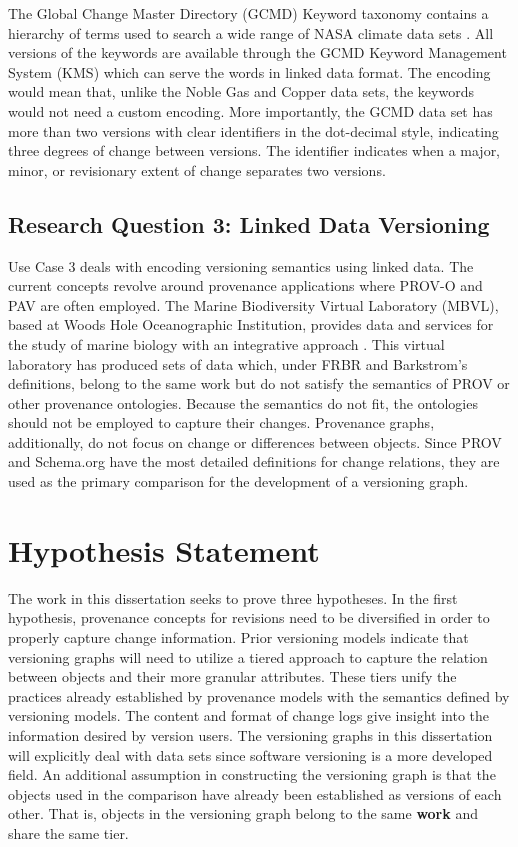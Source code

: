 The Global Change Master Directory (GCMD) Keyword taxonomy contains a hierarchy of terms used to search a wide range of NASA climate data sets \cite{GCMDKey}.
All versions of the keywords are available through the GCMD Keyword Management System (KMS) which can serve the words in linked data format.
The encoding would mean that, unlike the Noble Gas and Copper data sets, the keywords would not need a custom encoding.
More importantly, the GCMD data set has more than two versions with clear identifiers in the dot-decimal style, indicating three degrees of change between versions.
The identifier indicates when a major, minor, or revisionary extent of change separates two versions.

\subsection{Research Question 3: Linked Data Versioning}

Use Case 3 deals with encoding versioning semantics using linked data.
The current concepts revolve around provenance applications where PROV-O and PAV are often employed.
The Marine Biodiversity Virtual Laboratory (MBVL), based at Woods Hole Oceanographic Institution, provides data and services for the study of marine biology with an integrative approach \cite{mbvl}.
This virtual laboratory has produced sets of data which, under FRBR and Barkstrom's definitions, belong to the same work but do not satisfy the semantics of PROV or other provenance ontologies.
Because the semantics do not fit, the ontologies should not be employed to capture their changes.
Provenance graphs, additionally, do not focus on change or differences between objects.
Since PROV and Schema.org have the most detailed definitions for change relations, they are used as the primary comparison for the development of a versioning graph.

\section{Hypothesis Statement}

The work in this dissertation seeks to prove three hypotheses.
In the first hypothesis, provenance concepts for revisions need to be diversified in order to properly capture change information.
Prior versioning models indicate that versioning graphs will need to utilize a tiered approach to capture the relation between objects and their more granular attributes.
These tiers unify the practices already established by provenance models with the semantics defined by versioning models.
The content and format of change logs give insight into the information desired by version users.
The versioning graphs in this dissertation will explicitly deal with data sets since software versioning is a more developed field.
An additional assumption in constructing the versioning graph is that the objects used in the comparison have already been established as versions of each other.
That is, objects in the versioning graph belong to the same \textbf{work} and share the same tier.

